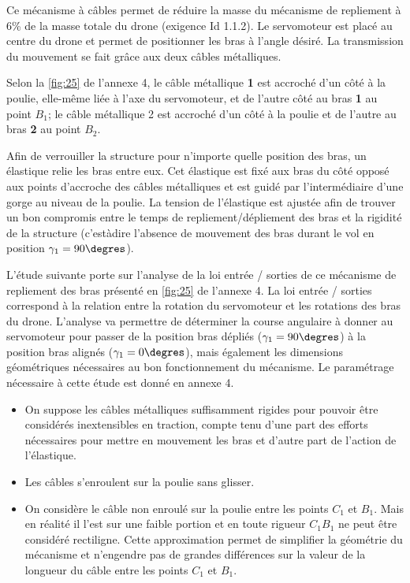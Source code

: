 Ce mécanisme à câbles permet de réduire la masse du mécanisme de repliement à 6\% de
la masse totale du drone (exigence Id 1.1.2). Le servomoteur est placé au centre du drone
et permet de positionner les bras à l’angle désiré. La transmission du mouvement se fait
grâce aux deux câbles métalliques. 

Selon la \autoref{fig:25} de l’annexe 4, le câble métallique \textbf{1}
est accroché d’un côté à la poulie, elle­-même liée à l’axe du servomoteur, et de l’autre côté
au bras \textbf{1} au point $B_1$; 
le câble métallique 2 est accroché d’un côté à la poulie et de l’autre
au bras \textbf{2} au point $B_2$.


Afin de verrouiller la structure pour n’importe quelle position des bras, un élastique relie les
bras entre eux. Cet élastique est fixé aux bras du côté opposé aux points d’accroche des
câbles métalliques et est guidé par l’intermédiaire d’une gorge au niveau de la poulie. La
tension de l’élastique est ajustée afin de trouver un bon compromis entre le temps de repliement/dépliement des bras et la rigidité de la structure (c’est­à­dire l’absence de mouvement
des bras durant le vol en position $\gamma_1 = 90\degres$).

L’étude suivante porte sur l’analyse de la loi entrée / sorties de ce mécanisme de repliement
des bras présenté en \autoref{fig:25} de l’annexe 4. La loi entrée / sorties correspond à la relation
entre la rotation du servomoteur et les rotations des bras du drone. L’analyse va permettre
de déterminer la course angulaire à donner au servomoteur pour passer de la position bras
dépliés ($\gamma_1 = 90\degres$) à la position bras alignés ($\gamma_1 = 0\degres$), mais également les dimensions géométriques nécessaires au bon fonctionnement du mécanisme. Le paramétrage nécessaire
à cette étude est donné en annexe 4.

\begin{hypo}
\begin{itemize}
\item On suppose les câbles métalliques suffisamment rigides pour pouvoir être considérés
inextensibles en traction, compte tenu d’une part des efforts nécessaires pour mettre
en mouvement les bras et d’autre part de l’action de l’élastique.
­\item Les câbles s’enroulent sur la poulie sans glisser.
\item On considère le câble non enroulé sur la poulie entre les points $C_1$ et $B_1$. Mais en réalité
il l’est sur une faible portion et en toute rigueur $C_1B_1$ ne peut être considéré rectiligne.
Cette approximation permet de simplifier la géométrie du mécanisme et n’engendre
pas de grandes différences sur la valeur de la longueur du câble entre les points $C_1$ et
$B_1$.
\end{itemize}
\end{hypo}



